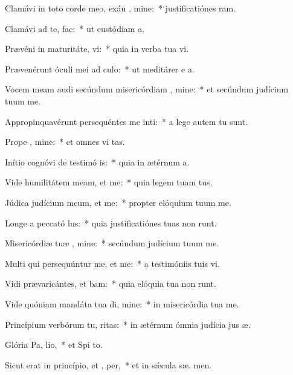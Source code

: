 \item Clamávi in toto corde meo, exáu , mine:~* justificatiónes  ram.
\item Clamávi ad te,   fac:~* ut custódiam  a.
\item Prævéni in maturitáte,  vi:~* quia in verba tua vi.
\item Prævenérunt óculi mei ad  culo:~* ut meditárer e a.
\item Vocem meam audi secúndum misericórdiam , mine:~* et secúndum judícium tuum  me.
\item Appropinquavérunt persequéntes me inti:~* a lege autem tu   sunt.
\item Prope  , mine:~* et omnes vi  tas.
\item Inítio cognóvi de testimó is:~* quia in ætérnum  a.
\item Vide humilitátem meam, et  me:~* quia legem tuam   tus.
\item Júdica judícium meum, et  me:~* propter elóquium tuum  me.
\item Longe a peccató lus:~* quia justificatiónes tuas non runt.
\item Misericórdiæ tuæ , mine:~* secúndum judícium tuum  me.
\item Multi qui persequúntur me, et  me:~* a testimóniis tuis  vi.
\item Vidi prævaricántes, et bam:~* quia elóquia tua non runt.
\item Vide quóniam mandáta tua di, mine:~* in misericórdia tua  me.
\item Princípium verbórum tu, ritas:~* in ætérnum ómnia judícia jus æ.
\item Glória Pa,  lio,~* et Spi to.
\item Sicut erat in princípio, et ,  per,~* et in sǽcula sæ. men.
